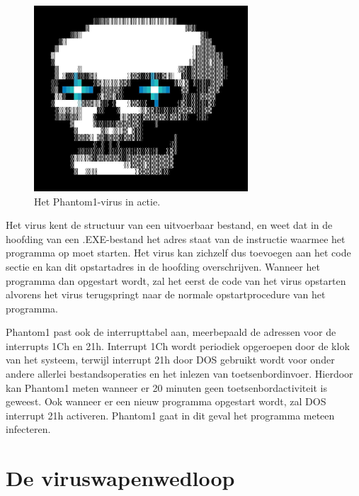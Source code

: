 \begin{figure}
\begin{center}
\includegraphics[width=80mm]{images/Phantom1.png}
\end{center}
\caption{Het Phantom1-virus in actie.}
\label{phantom1}
\end{figure}

Het virus kent de structuur van een uitvoerbaar bestand, en weet dat in de hoofding van een .EXE-bestand het adres staat van de instructie waarmee het programma op moet starten. Het virus kan zichzelf dus toevoegen aan het code sectie en kan dit opstartadres in de hoofding overschrijven. Wanneer het programma dan opgestart wordt, zal het eerst de code van het virus opstarten alvorens het virus terugspringt naar de normale opstartprocedure van het programma.

Phantom1 past ook de interrupttabel aan, meerbepaald de adressen voor de interrupts 1Ch en 21h. Interrupt 1Ch wordt periodiek opgeroepen door de klok van het systeem, terwijl interrupt 21h door DOS gebruikt wordt voor onder andere allerlei bestandsoperaties en het inlezen van toetsenbordinvoer. Hierdoor kan Phantom1 meten wanneer er 20 minuten geen toetsenbordactiviteit is geweest. Ook wanneer er een nieuw programma opgestart wordt, zal DOS interrupt 21h activeren. Phantom1 gaat in dit geval het programma meteen infecteren.

\section{De viruswapenwedloop}

